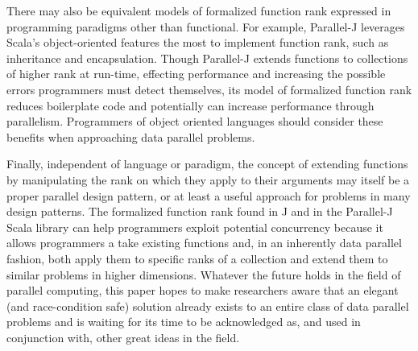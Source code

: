 There may also be equivalent models of formalized function rank 
expressed in programming paradigms other than functional. 
For example, Parallel-J leverages Scala's object-oriented features the most to implement function rank, 
such as inheritance and encapsulation. 
Though Parallel-J extends functions to collections of higher rank at run-time, 
effecting performance and increasing the possible errors programmers must detect themselves, 
its model of formalized function rank reduces boilerplate code and 
potentially can increase performance through parallelism. 
Programmers of object oriented languages should consider these benefits 
when approaching data parallel problems.

Finally, independent of language or paradigm, 
the concept of extending functions by manipulating the rank on which they apply to their arguments 
may itself be a proper parallel design pattern, 
or at least a useful approach for problems in many design patterns.
The formalized function rank found in J and in the Parallel-J Scala library 
can help programmers exploit potential concurrency 
because it allows programmers a take existing functions and, in an inherently data parallel fashion, 
both apply them to specific ranks of a collection and 
extend them to similar problems in higher dimensions. 
Whatever the future holds in the field of parallel computing, 
this paper hopes to make researchers aware that an elegant (and race-condition safe) solution 
already exists to an entire class of data parallel problems 
and is waiting for its time to be acknowledged as, and used in conjunction with, other great ideas in the field.
